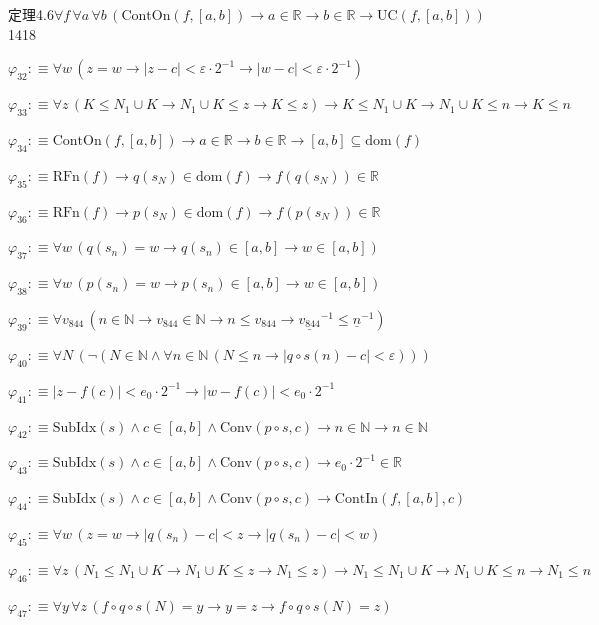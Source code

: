 \begin{fullproof}{定理4.6}{$\forall f\,\forall a\,\forall b\,(\mathrm{ContOn}(f,[a,b]) \to a \in \mathbb{R} \to b \in \mathbb{R} \to \mathrm{UC}(f,[a,b]))$}{1418}
\begin{abbrevlist}
\item $\varphi_{32} :\equiv \forall w\,(z = w \to \lvert z - c \rvert < \varepsilon \cdot 2^{-1} \to \lvert w - c \rvert < \varepsilon \cdot 2^{-1})$
\item $\varphi_{33} :\equiv \forall z\,(K \leq N_{1} \cup K \to N_{1} \cup K \leq z \to K \leq z) \to K \leq N_{1} \cup K \to N_{1} \cup K \leq n \to K \leq n$
\item $\varphi_{34} :\equiv \mathrm{ContOn}(f,[a,b]) \to a \in \mathbb{R} \to b \in \mathbb{R} \to [a,b] \subseteq \mathrm{dom}(f)$
\item $\varphi_{35} :\equiv \mathrm{RFn}(f) \to q(s_{N}) \in \mathrm{dom}(f) \to f(q(s_{N})) \in \mathbb{R}$
\item $\varphi_{36} :\equiv \mathrm{RFn}(f) \to p(s_{N}) \in \mathrm{dom}(f) \to f(p(s_{N})) \in \mathbb{R}$
\item $\varphi_{37} :\equiv \forall w\,(q(s_{n}) = w \to q(s_{n}) \in [a,b] \to w \in [a,b])$
\item $\varphi_{38} :\equiv \forall w\,(p(s_{n}) = w \to p(s_{n}) \in [a,b] \to w \in [a,b])$
\item $\varphi_{39} :\equiv \forall v_{844}\,(n \in \mathbb{N} \to v_{844} \in \mathbb{N} \to n \leq v_{844} \to \underline{v_{844}}^{-1} \leq \underline{n}^{-1})$
\item $\varphi_{40} :\equiv \forall N\,(\neg (N \in \mathbb{N} \land \forall n \in \mathbb{N}\,(N \leq n \to \lvert q \circ s(n) - c \rvert < \varepsilon)))$
\item $\varphi_{41} :\equiv \lvert z - f(c) \rvert < e_{0} \cdot 2^{-1} \to \lvert w - f(c) \rvert < e_{0} \cdot 2^{-1}$
\item $\varphi_{42} :\equiv \mathrm{SubIdx}(s) \land c \in [a,b] \land \mathrm{Conv}(p \circ s,c) \to n \in \mathbb{N} \to n \in \mathbb{N}$
\item $\varphi_{43} :\equiv \mathrm{SubIdx}(s) \land c \in [a,b] \land \mathrm{Conv}(p \circ s,c) \to e_{0} \cdot 2^{-1} \in \mathbb{R}$
\item $\varphi_{44} :\equiv \mathrm{SubIdx}(s) \land c \in [a,b] \land \mathrm{Conv}(p \circ s,c) \to \mathrm{ContIn}(f,[a,b],c)$
\item $\varphi_{45} :\equiv \forall w\,(z = w \to \lvert q(s_{n}) - c \rvert < z \to \lvert q(s_{n}) - c \rvert < w)$
\item $\varphi_{46} :\equiv \forall z\,(N_{1} \leq N_{1} \cup K \to N_{1} \cup K \leq z \to N_{1} \leq z) \to N_{1} \leq N_{1} \cup K \to N_{1} \cup K \leq n \to N_{1} \leq n$
\item $\varphi_{47} :\equiv \forall y\,\forall z\,(f \circ q \circ s(N) = y \to y = z \to f \circ q \circ s(N) = z)$

\end{abbrevlist}
\end{fullproof}
